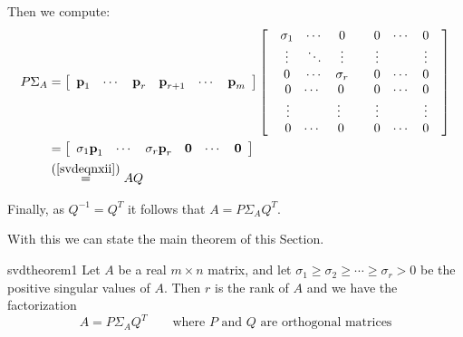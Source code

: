 \begin{enumerate}[label=\textbf{\arabic*.},leftmargin=*]
\noindent Then we compute:
\begin{align*}
P\Sigma _{A} & =  \left[ \begin{array}{cccccc}\textbf{p}_{1} & \cdots & \textbf{p}_{r} & \textbf{p}_{r+1} & \cdots & \textbf{p}_{m}\end{array}\right] \left[ 
\begin{array}{cc}
\begin{array}{ccc}
\sigma _{1} & \cdots  & 0 \\ 
\vdots  & \ddots  & \vdots  \\ 
0 & \cdots  & \sigma _{r}
\end{array}
& 
\begin{array}{ccc}
0 & \cdots  & 0 \\ 
\vdots  &  & \vdots  \\ 
0 & \cdots  & 0
\end{array}
\\ 
\begin{array}{ccc}
0 & \cdots  & ~0 \\ 
\vdots  &  & \vdots  \\ 
0 & \cdots  & ~0
\end{array}
& 
\begin{array}{ccc}
0 & \cdots  & 0 \\ 
\vdots  &  & \vdots  \\ 
0 & \cdots  & 0
\end{array}
\end{array}
\right]  \\ 
&= \left[ \begin{array}{cccccc}\sigma_{1}\textbf{p}_{1} & \cdots & \sigma_{r}\textbf{p}_{r} & \textbf{0} & \cdots & \textbf{0}\end{array}\right] \\ 
& \overset{\mbox{(\ref{svdeqnxii})}}{=}  AQ
\end{align*}

\noindent Finally, as $Q^{-1}=Q^{T}$ it follows that $A=P\Sigma _{A}Q^{T}$.
\end{enumerate}

With this we can state the main theorem of this Section.

\begin{theorem}{}{svdtheorem1} 
Let $A$ be a real $m\times n$ matrix, and let $\sigma_{1}\geq \sigma_{2}\geq
\cdots \geq \sigma_{r}>0$ be the positive singular values of $A$.
Then $r$ is the rank of $A$ and we have the factorization
\begin{equation*}
A=P\Sigma_{A}Q^{T}\qquad \mbox{where } P \mbox{ and } Q \mbox{ are orthogonal matrices}
\end{equation*}
\end{theorem}

